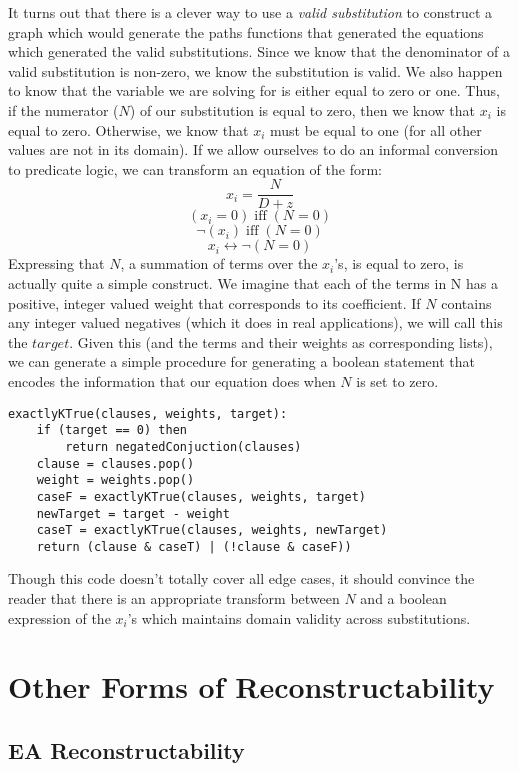It turns out that there is a clever way to use a \emph{valid substitution} to construct a graph which would generate the paths functions that generated the equations which generated the valid substitutions.
Since we know that the denominator of a valid substitution is non-zero, we know the substitution is valid.  
We also happen to know that the variable we are solving for is either equal to zero or one.  
Thus, if the numerator ($N$) of our substitution is equal to zero, then we know that $x_i$ is equal to zero.  
Otherwise, we know that $x_i$ must be equal to one (for all other values are not in its domain). 
If we allow ourselves to do an informal conversion to predicate logic, we can transform an equation of the form:
 $$x_i = \frac{N}{D + z}$$ 
 $$(x_i = 0) \; \text{iff} \; (N = 0)$$
 $$\neg(x_i) \; \text{iff} \; (N = 0)$$
 $$x_i  \leftrightarrow  \neg(N = 0)$$
Expressing that $N$, a summation of terms over the $x_i$'s, is equal to zero, is actually quite a simple construct. 
We imagine that each of the terms in N has a positive, integer valued weight that corresponds to its coefficient. 
If $N$ contains any integer valued negatives (which it does in real applications), we will call this the $target$.
Given this (and the terms and their weights as corresponding lists), we can generate a simple procedure for generating a boolean statement that encodes the information that our equation does when $N$ is set to zero.

\begin{lstlisting}[frame=single]
exactlyKTrue(clauses, weights, target):
	if (target == 0) then
		return negatedConjuction(clauses)
	clause = clauses.pop()
	weight = weights.pop()
	caseF = exactlyKTrue(clauses, weights, target)
	newTarget = target - weight
	caseT = exactlyKTrue(clauses, weights, newTarget)
	return (clause & caseT) | (!clause & caseF))
\end{lstlisting}

Though this code doesn't totally cover all edge cases, it should convince the reader that there is an appropriate transform between $N$ and a boolean expression of the $x_i$'s which maintains domain validity across substitutions.

\section{Other Forms of Reconstructability}
\subsection{EA Reconstructability}
